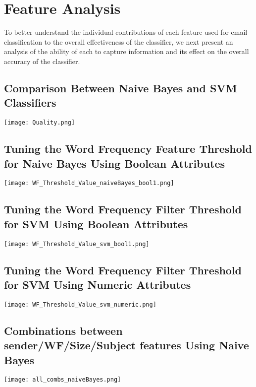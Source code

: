 
\chapter{Feature Analysis} %

\label{Chapter6} %



To better understand the individual contributions of each feature used for email classification to the overall effectiveness of the classifier, we next present an analysis of the ability of each to capture information and its effect on the overall accuracy of the classifier.

\section{Comparison Between Naive Bayes and SVM Classifiers}
\texttt{[image: Quality.png]}

\section{Tuning the Word Frequency Feature Threshold for Naive Bayes Using Boolean Attributes}
\texttt{[image: WF\_Threshold\_Value\_naiveBayes\_bool1.png]}

\section{Tuning the Word Frequency Filter Threshold for SVM Using Boolean Attributes}
\texttt{[image: WF\_Threshold\_Value\_svm\_bool1.png]}

\section{Tuning the Word Frequency Filter Threshold for SVM Using Numeric Attributes}
\texttt{[image: WF\_Threshold\_Value\_svm\_numeric.png]}

\section{Combinations between sender/WF/Size/Subject features Using Naive Bayes}
\texttt{[image: all\_combs\_naiveBayes.png]}

